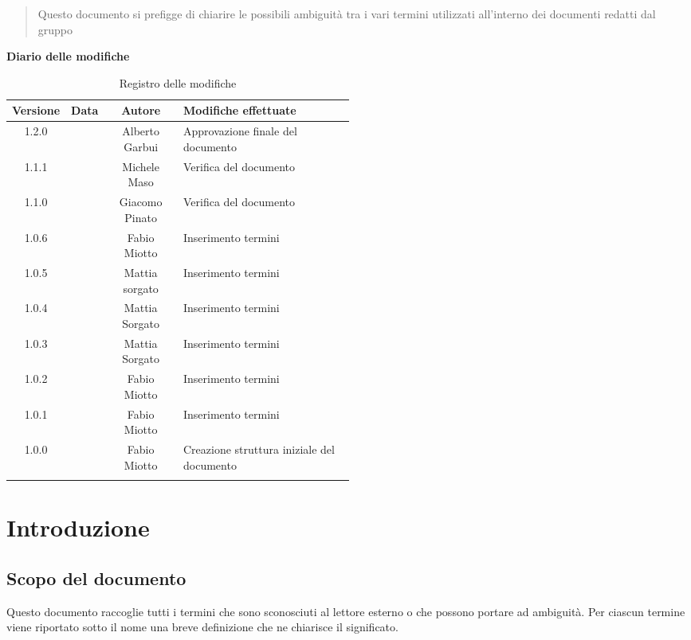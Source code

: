 \begin{abstract}
\begin{center}
Questo documento si prefigge di chiarire le possibili ambiguità tra i vari termini utilizzati all'interno dei documenti redatti dal gruppo \NomeGruppo{}
\end{center}
\end{abstract}

\newpage
\textbf{Diario delle modifiche}
\begin{center}
\begin{longtable}{|c|c|c|p{0.5\linewidth}|}
\toprule
\textbf{Versione} & \textbf{Data} & \textbf{Autore} & \textbf{Modifiche effettuate}\\
\midrule
1.2.0 &  & Alberto Garbui & Approvazione finale del documento\\
\midrule
1.1.1 &  & Michele Maso & Verifica del documento \\
\midrule
1.1.0 &  & Giacomo Pinato & Verifica del documento \\
\midrule
1.0.6 &  & Fabio Miotto &   Inserimento termini\\
\midrule
1.0.5 &  & Mattia sorgato &   Inserimento termini\\
\midrule
1.0.4 &  & Mattia Sorgato  &   Inserimento termini\\
\midrule
1.0.3 &  & Mattia Sorgato  &  Inserimento termini \\
\midrule
1.0.2 & & Fabio Miotto  &  Inserimento termini\\
\midrule
1.0.1 &  & Fabio Miotto &  Inserimento termini\\
\midrule
1.0.0 &  & Fabio Miotto & Creazione struttura iniziale del documento\\


\bottomrule
\caption{Registro delle modifiche}
\label{tab:changelog}
\end{longtable}
\end{center}

\newpage
\section{Introduzione}%
\label{1.0}
\subsection{Scopo del documento}%
\label{1.1}
Questo documento raccoglie tutti i termini che sono sconosciuti al lettore esterno o che possono portare ad ambiguità. Per ciascun termine viene riportato sotto il nome una breve definizione che ne chiarisce il significato.
